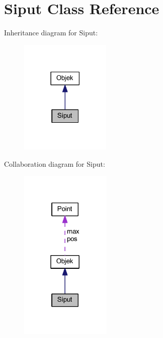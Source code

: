 \hypertarget{class_siput}{}\section{Siput Class Reference}
\label{class_siput}


Inheritance diagram for Siput\+:\nopagebreak
\begin{figure}[H]
\begin{center}
\leavevmode
\includegraphics[width=122pt]{class_siput__inherit__graph}
\end{center}
\end{figure}


Collaboration diagram for Siput\+:\nopagebreak
\begin{figure}[H]
\begin{center}
\leavevmode
\includegraphics[width=123pt]{class_siput__coll__graph}
\end{center}
\end{figure}
